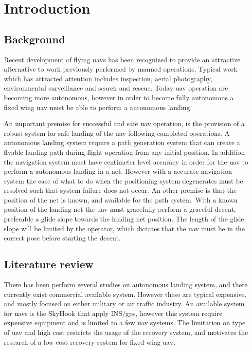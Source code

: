 \chapter{Introduction}
\section{Background}
Recent development of flying \glspl{uav} has been recognized to provide an attractive alternative to work previously performed by manned operations. Typical work which has attracted attention includes inspection, aerial photography, environmental surveillance and search and rescue. Today \gls{uav} operation are becoming more autonomous, however in order to become fully autonomous a fixed wing \gls{uav} must be able to perform a autonomous landing.

An important premise for successful and safe \gls{uav} operation, is the provision of a robust system for safe landing of the \gls{uav} following completed operations. A autonomous landing system require a path generation system that can create a flyable landing path during flight operation from any initial position. In addition the navigation system must have centimeter level accuracy in order for the \gls{uav} to perform a autonomous landing in a net. However with a accurate navigation system the case of what to do when the positioning system degenerates must be resolved such that system failure does not occur. An other premise is that the position of the net is known, and available for the path system. With a known position of the landing net the \gls{uav} must gracefully perform a graceful decent, preferable a glide slope towards the landing net position. The length of the glide slope will be limited by the operator, which dictates that the \gls{uav} must be in the correct pose before starting the decent.
\section{Literature review}
There has been perform several studies on autonomous landing system, and there currently exist commercial available system. However these are typical expensive, and mostly focused on either military or air traffic industry. An available system for \glspl{uav} is the SkyHook that apply INS/\gls{gps}\citep{SkyHook}, however this system require expensive equipment and is limited to a few \gls{uav} systems. The limitation on type of \gls{uav} and high cost restricts the usage of the recovery system, and motivates the research of a low cost recovery system for fixed wing \gls{uav}.

